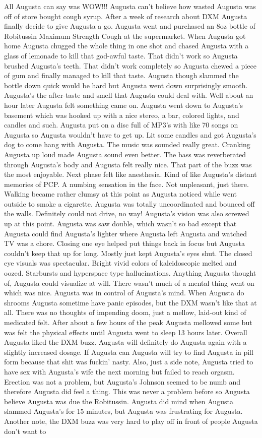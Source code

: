 \documentclass[12pt]{book}
\begin{document}
All Augusta can say was WOW!!! Augusta can't believe how wasted Augusta was off of store bought cough syrup. After a week of research about DXM Augusta finally decide to give Augusta a go. Augusta went and purchased an 8oz bottle of Robitussin Maximum Strength Cough at the supermarket. When Augusta got home Augusta chugged the whole thing in one shot and chased Augusta with a glass of lemonade to kill that god-awful taste. That didn't work so Augusta brushed Augusta's teeth. That didn't work completely so Augusta chewed a piece of gum and finally managed to kill that taste. Augusta though slammed the bottle down quick would be hard but Augusta went down surprisingly smooth. Augusta's the after-taste and smell that Augusta could deal with. Well about an hour later Augusta felt something came on. Augusta went down to Augusta's basement which was hooked up with a nice stereo, a bar, colored lights, and candles and such. Augusta put on a disc full of MP3's with like 70 songs on Augusta so Augusta wouldn't have to get up. Lit some candles and got Augusta's dog to come hang with Augusta. The music was sounded really great. Cranking Augusta up loud made Augusta sound even better. The bass was reverberated through Augusta's body and Augusta felt really nice. That part of the buzz was the most enjoyable. Next phase felt like anesthesia. Kind of like Augusta's distant memories of PCP. A numbing sensation in the face. Not unpleasant, just there. Walking became rather clumsy at this point as Augusta noticed while went outside to smoke a cigarette. Augusta was totally uncoordinated and bounced off the walls. Definitely could not drive, no way! Augusta's vision was also screwed up at this point. Augusta was saw double, which wasn't so bad except that Augusta could find Augusta's lighter where Augusta left Augusta and watched TV was a chore. Closing one eye helped put things back in focus but Augusta couldn't keep that up for long. Mostly just kept Augusta's eyes shut. The closed eye visuals was spectacular. Bright vivid colors of kaleidoscopic melted and oozed. Starbursts and hyperspace type hallucinations. Anything Augusta thought of, Augusta could visualize at will. There wasn't much of a mental thing went on which was nice. Augusta was in control of Augusta's mind. When Augusta do shrooms Augusta sometime have panic episodes, but the DXM wasn't like that at all. There was no thoughts of impending doom, just a mellow, laid-out kind of medicated felt. After about a few hours of the peak Augusta mellowed some but was felt the physical effects until Augusta went to sleep 13 hours later. Overall Augusta liked the DXM buzz. Augusta will definitely do Augusta again with a slightly increased dosage. If Augusta can Augusta will try to find Augusta in pill form because that shit was fuckin' nasty. Also, just a side note, Augusta tried to have sex with Augusta's wife the next morning but failed to reach orgasm. Erection was not a problem, but Augusta's Johnson seemed to be numb and therefore Augusta did feel a thing. This was never a problem before so Augusta believe Augusta was due the Robitussin. Augusta did mind when Augusta slammed Augusta's for 15 minutes, but Augusta was frustrating for Augusta. Another note, the DXM buzz was very hard to play off in front of people Augusta don't want to 
\end{document}
